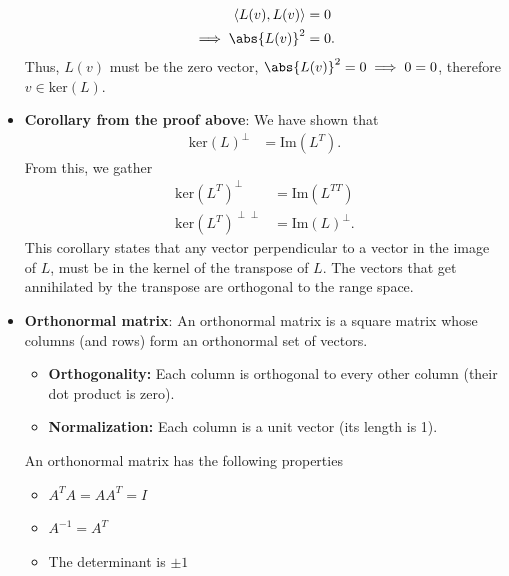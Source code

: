 \documentclass{report}
\begin{document}
\begin{itemize}
\begin{align*}
                \left\langle L(v), L(v) \right\rangle &= 0 \\
                \implies \abs{L(v)}^{2} &= 0
            .\end{align*}
            Thus, $L(v)$ must be the zero vector, $\abs{L(v)}^{2}  = 0 \implies 0= 0$, therefore $v\in \text{ker}(L)$.
        \item \textbf{Corollary from the proof above}: We have shown that 
            \begin{align*}
                \text{ker}(L)^{\perp} &= \text{Im}(L^{T})
            .\end{align*}
            From this, we gather
            \begin{align*}
                \text{ker}(L^{T})^{\perp} &= \text{Im}(L^{TT}) \\
                                          \text{ker}(L^{T})^{\perp\perp}&= \text{Im}(L)^{\perp}
            .\end{align*}
            \bigbreak \noindent 
            This corollary states that any vector perpendicular to a vector in the image of $L$, must be in the kernel of the transpose of $L$. The vectors that get annihilated by the transpose are orthogonal to the range space.
        \item \textbf{Orthonormal matrix}: An orthonormal matrix is a square matrix whose columns (and rows) form an orthonormal set of vectors. 
            \begin{itemize}
                \item \textbf{Orthogonality:} Each column is orthogonal to every other column (their dot product is zero).
                \item \textbf{Normalization:} Each column is a unit vector (its length is 1).
            \end{itemize}
            An orthonormal matrix has the following properties
            \begin{itemize}
                \item $A^{T}A = AA^{T} = I $
                \item $A^{-1} = A^{T}$
                \item The determinant is $\pm 1$
            \end{itemize}


    \end{itemize}

    \pagebreak 
\end{document}
